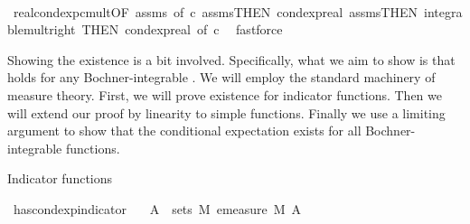 \begin{isabellebody}
%
\isadelimproof
\ \ %
\endisadelimproof
%
\isatagproof
{}\isamarkupfalse%
\ real{\isacharunderscore}{\kern0pt}cond{\isacharunderscore}{\kern0pt}exp{\isacharunderscore}{\kern0pt}cmult{\isacharbrackleft}{\kern0pt}OF\ assms{\isacharparenleft}{\kern0pt}{}{\isacharparenright}{\kern0pt}{\isacharcomma}{\kern0pt}\ of\ c{\isacharbrackright}{\kern0pt}\ assms{\isacharparenleft}{\kern0pt}{}{\isacharparenright}{\kern0pt}{\isacharbrackleft}{\kern0pt}THEN\ cond{\isacharunderscore}{\kern0pt}exp{\isacharunderscore}{\kern0pt}real{\isacharbrackright}{\kern0pt}\ assms{\isacharparenleft}{\kern0pt}{}{\isacharparenright}{\kern0pt}{\isacharbrackleft}{\kern0pt}THEN\ integrable{\isacharunderscore}{\kern0pt}mult{\isacharunderscore}{\kern0pt}right{\isacharcomma}{\kern0pt}\ THEN\ cond{\isacharunderscore}{\kern0pt}exp{\isacharunderscore}{\kern0pt}real{\isacharcomma}{\kern0pt}\ of\ c{\isacharbrackright}{\kern0pt}\ \isamarkupfalse%
\ fastforce%
\endisatagproof
{\isafoldproof}%
%
\isadelimproof
%
\endisadelimproof
%
\isadelimdocument
%
\endisadelimdocument
%
\isatagdocument
%
\isamarkuptrue%
%
\endisatagdocument
{\isafolddocument}%
%
\isadelimdocument
%
\endisadelimdocument
%
\begin{isamarkuptext}%
Showing the existence is a bit involved. Specifically, what we aim to show is that  holds for any Bochner-integrable .
      We will employ the standard machinery of measure theory. First, we will prove existence for indicator functions. 
      Then we will extend our proof by linearity to simple functions. 
      Finally we use a limiting argument to show that the conditional expectation exists for all Bochner-integrable functions.%
\end{isamarkuptext}\isamarkuptrue%
%
\begin{isamarkuptext}%
Indicator functions%
\end{isamarkuptext}\isamarkuptrue%
\isamarkupfalse%
\ has{\isacharunderscore}{\kern0pt}cond{\isacharunderscore}{\kern0pt}exp{\isacharunderscore}{\kern0pt}indicator{\isacharcolon}{\kern0pt}\isanewline
\ \ \ {\isachardoublequoteopen}A\ {\isasymin}\ sets\ M{\isachardoublequoteclose}\ {\isachardoublequoteopen}emeasure\ M\ A\ {\isacharless}{\kern0pt}\ {\isasyminfinity}{\isachardoublequoteclose}\isanewline

\end{isabellebody}
